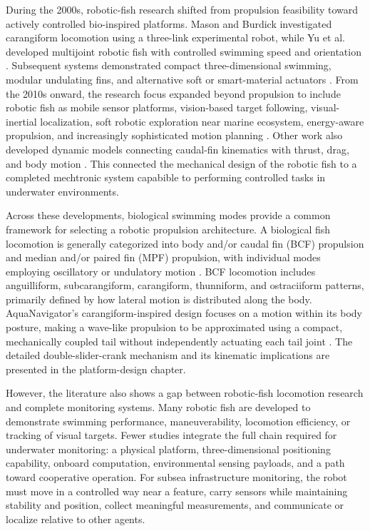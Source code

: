 \documentclass{uhcoethesis}
\begin{document}
During the 2000s, robotic-fish research shifted from propulsion feasibility toward actively controlled bio-inspired platforms. Mason and Burdick investigated carangiform locomotion using a three-link experimental robot, while Yu et al. developed multijoint robotic fish with controlled swimming speed and orientation \cite{Mason2000,Yu2004,Yu2005}. Subsequent systems demonstrated compact three-dimensional swimming, modular undulating fins, and alternative soft or smart-material actuators \cite{Liu2005,Low2006,Chen2010}. From the 2010s onward, the research focus expanded beyond propulsion to include robotic fish as mobile sensor platforms, vision-based target following, visual-inertial localization, soft robotic exploration near marine ecosystem, energy-aware propulsion, and increasingly sophisticated motion planning \cite{Tan2011,Hu2009,Wang2015,Katzschmann2018,Li2024,Jiang2024}. Other work also developed dynamic models connecting caudal-fin kinematics with thrust, drag, and body motion \cite{Wang2013,Park2012}. This connected the mechanical design of the robotic fish to a completed mechtronic system capabible to performing controlled tasks in underwater environments.

Across these developments, biological swimming modes provide a common framework for selecting a robotic propulsion architecture. A biological fish locomotion is generally categorized into body and/or caudal fin (BCF) propulsion and median and/or paired fin (MPF) propulsion, with individual modes employing oscillatory or undulatory motion \cite{Sfakiotakis1999}. BCF locomotion includes anguilliform, subcarangiform, carangiform, thunniform, and ostraciiform patterns, primarily defined by how lateral motion is distributed along the body. AquaNavigator's carangiform-inspired design focuses on a motion within its body posture, making a wave-like propulsion to be approximated using a compact, mechanically coupled tail without independently actuating each tail joint \cite{Xie2021,Zuo2021}. The detailed double-slider-crank mechanism and its kinematic implications are presented in the platform-design chapter.

However, the literature also shows a gap between robotic-fish locomotion research and complete monitoring systems. Many robotic fish are developed to demonstrate swimming performance, maneuverability, locomotion efficiency, or tracking of visual targets. Fewer studies integrate the full chain required for underwater monitoring: a physical platform, three-dimensional positioning capability, onboard computation, environmental sensing payloads, and a path toward cooperative operation. For subsea infrastructure monitoring, the robot must move in a controlled way near a feature, carry sensors while maintaining stability and position, collect meaningful measurements, and communicate or localize relative to other agents.
\end{document}
